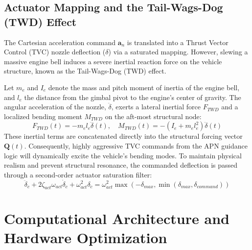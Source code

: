 \documentclass[11pt,a4paper]{article}
\theoremstyle{definition}
\numberwithin{equation}{section}
\begin{document}
\subsection{Actuator Mapping and the Tail-Wags-Dog (TWD) Effect}
The Cartesian acceleration command $\mathbf{a}_n$ is translated into a Thrust Vector Control (TVC) nozzle deflection ($\delta$) via a saturated mapping. However, slewing a massive engine bell induces a severe inertial reaction force on the vehicle structure, known as the Tail-Wags-Dog (TWD) effect. 

Let $m_e$ and $I_e$ denote the mass and pitch moment of inertia of the engine bell, and $l_e$ the distance from the gimbal pivot to the engine's center of gravity. The angular acceleration of the nozzle, $\ddot{\delta}$, exerts a lateral inertial force $F_{TWD}$ and a localized bending moment $M_{TWD}$ on the aft-most structural node:
\begin{equation}
    F_{TWD}(t) = -m_e l_e \ddot{\delta}(t), \quad M_{TWD}(t) = -(I_e + m_e l_e^2) \ddot{\delta}(t)
\end{equation}
These inertial terms are concatenated directly into the structural forcing vector $\mathbf{Q}(t)$. Consequently, highly aggressive TVC commands from the APN guidance logic will dynamically excite the vehicle's bending modes. To maintain physical realism and prevent structural resonance, the commanded deflection is passed through a second-order actuator saturation filter:
\begin{equation}
    \ddot{\delta}_c + 2\zeta_{act}\omega_{act}\dot{\delta}_c + \omega_{act}^2 \delta_c = \omega_{act}^2 \max(-\delta_{max}, \min(\delta_{max}, \delta_{command}))
\end{equation}



\section{Computational Architecture and Hardware Optimization}
\label{sec:architecture}
\end{document}
